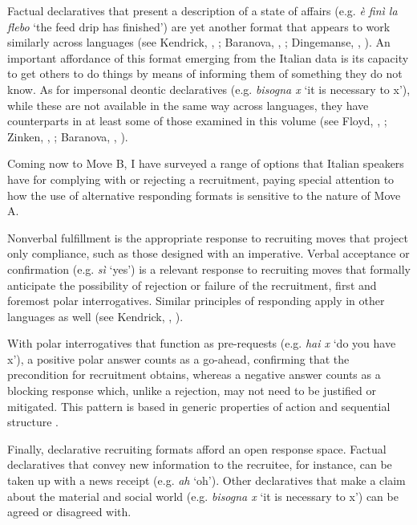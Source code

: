 \documentclass[output=paper,modfonts]{langscibook}
\begin{document}
Factual declaratives that present a description of a state of affairs (e.g. \textit{è finì la flebo} ‘the feed drip has finished’) are yet another format that appears to work similarly across languages (see Kendrick, , ; Baranova, , ; Dingemanse, , ). An important affordance of this format emerging from the Italian data is its capacity to get others to do things by means of informing them of something they do not know. As for impersonal deontic declaratives (e.g. \textit{bisogna x} ‘it is necessary to x’), while these are not available in the same way across languages, they have counterparts in at least some of those examined in this volume (see Floyd, , ; Zinken, , ; Baranova, , ).

Coming now to Move B, I have surveyed a range of options that Italian speakers have for complying with or rejecting a recruitment, paying special attention to how the use of alternative responding formats is sensitive to the nature of Move A. 

Nonverbal fulfillment is the appropriate response to recruiting moves that project only compliance, such as those designed with an imperative. Verbal acceptance or confirmation (e.g. \textit{sì} ‘yes’) is a relevant response to recruiting moves that formally anticipate the possibility of rejection or failure of the recruitment, first and foremost polar interrogatives. Similar principles of responding apply in other languages as well (see Kendrick, , ). %

With polar interrogatives that function as pre-requests (e.g. \textit{hai x} ‘do you have x’), a positive polar answer counts as a go-ahead, confirming that the precondition for recruitment obtains, whereas a negative answer counts as a blocking response which, unlike a rejection, may not need to be justified or mitigated. This pattern is based in generic properties of action and sequential structure \citep{Schegloff2007,KendrickEtAl2020}. 

Finally, declarative recruiting formats afford an open response space. Factual declaratives that convey new information to the recruitee, for instance, can be taken up with a news receipt (e.g. \textit{ah} ‘oh’). Other declaratives that make a claim about the material and social world (e.g. \textit{bisogna x} ‘it is necessary to x’) can be agreed or disagreed with.
\end{document}
